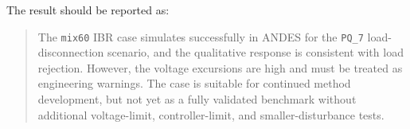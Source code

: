 \documentclass[11pt,letterpaper]{article}
\begin{document}
The result should be reported as:

\begin{quote}
The \texttt{mix60} IBR case simulates successfully in ANDES for the
\texttt{PQ\_7} load-disconnection scenario, and the qualitative response is
consistent with load rejection. However, the voltage excursions are high and
must be treated as engineering warnings. The case is suitable for continued
method development, but not yet as a fully validated benchmark without
additional voltage-limit, controller-limit, and smaller-disturbance tests.
\end{quote}
\end{document}
